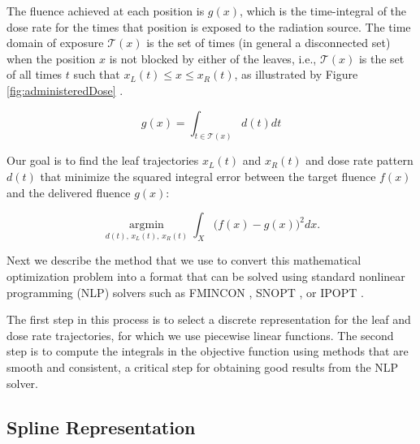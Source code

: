 \documentclass{iopart}
\begin{document}
The fluence achieved at each position is $g(x)$, which is the time-integral of the dose rate for the times that position is exposed to the radiation source.
The time domain of exposure $\mathcal{T}(x)$ is the set of times (in general a disconnected set) when the position $x$ is not blocked by either of the leaves, i.e.,
$\mathcal{T}(x)$ is the set of all times $t$ such that $x_L(t) \le x \leq x_R(t)$,
as illustrated by Figure \ref{fig:administeredDose} .

\begin{equation}
g(x) = \int_{t \in \mathcal{T}(x)} d(t) dt
\label{eqn:deliveredFluenceDose}
\end{equation}

Our goal is to find the leaf trajectories $x_L(t)$ and $x_R(t)$ and dose rate pattern $d(t)$
that minimize the squared integral error between the target fluence $f(x)$ and the delivered fluence $g(x)$:

\begin{equation}
\underset{d(t), \, x_L(t), \, x_R(t)}{\operatorname{argmin}}
\int_X \bigg(f(x) - g(x)\bigg)^2 dx .
\label{eqn:fluenceMapOptimization}
\end{equation}





Next we describe the method that we use to convert this mathematical optimization problem into a format that can be solved using standard nonlinear programming (NLP) solvers such as FMINCON \cite{MatlabOptimizationToolbox2014}, SNOPT \cite{Snopt7}, or IPOPT \cite{Wachter2006}.

The first step in this process is to select a discrete representation for the leaf and dose rate trajectories, for which we use piecewise linear functions. The second step is to compute the integrals in the objective function using methods that are smooth and consistent, a critical step for obtaining good results from the NLP solver.

\subsection{Spline Representation}
\end{document}

